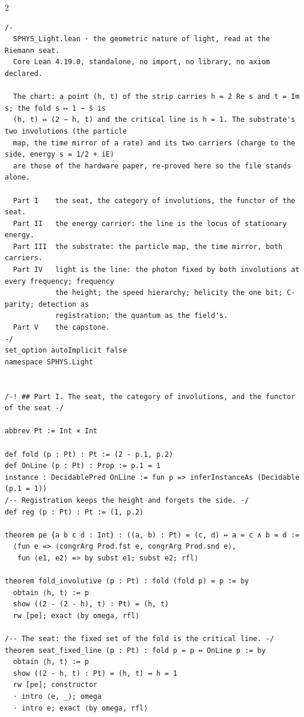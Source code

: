 \documentclass[10pt]{article}
\begin{document}
\begin{multicols}{2}
\begin{Verbatim}[fontsize=\fontsize{6.0}{6.9}\selectfont,breaklines,breakanywhere,breaksymbolleft={}]
/-
  SPHYS_Light.lean · the geometric nature of light, read at the Riemann seat.
  Core Lean 4.19.0, standalone, no import, no library, no axiom declared.

  The chart: a point (h, t) of the strip carries h = 2 Re s and t = Im s; the fold s ↦ 1 − s̄ is
  (h, t) ↦ (2 − h, t) and the critical line is h = 1. The substrate's two involutions (the particle
  map, the time mirror of a rate) and its two carriers (charge to the side, energy s = 1/2 + iE)
  are those of the hardware paper, re-proved here so the file stands alone.

  Part I    the seat, the category of involutions, the functor of the seat.
  Part II   the energy carrier: the line is the locus of stationary energy.
  Part III  the substrate: the particle map, the time mirror, both carriers.
  Part IV   light is the line: the photon fixed by both involutions at every frequency; frequency
            the height; the speed hierarchy; helicity the one bit; C-parity; detection as
            registration; the quantum as the field's.
  Part V    the capstone.
-/
set_option autoImplicit false
namespace SPHYS.Light


/-! ## Part I. The seat, the category of involutions, and the functor of the seat -/

abbrev Pt := Int × Int

def fold (p : Pt) : Pt := (2 - p.1, p.2)
def OnLine (p : Pt) : Prop := p.1 = 1
instance : DecidablePred OnLine := fun p => inferInstanceAs (Decidable (p.1 = 1))
/-- Registration keeps the height and forgets the side. -/
def reg (p : Pt) : Pt := (1, p.2)

theorem pe {a b c d : Int} : ((a, b) : Pt) = (c, d) ↔ a = c ∧ b = d :=
  ⟨fun e => ⟨congrArg Prod.fst e, congrArg Prod.snd e⟩,
   fun ⟨e1, e2⟩ => by subst e1; subst e2; rfl⟩

theorem fold_involutive (p : Pt) : fold (fold p) = p := by
  obtain ⟨h, t⟩ := p
  show ((2 - (2 - h), t) : Pt) = (h, t)
  rw [pe]; exact ⟨by omega, rfl⟩

/-- The seat: the fixed set of the fold is the critical line. -/
theorem seat_fixed_line (p : Pt) : fold p = p ↔ OnLine p := by
  obtain ⟨h, t⟩ := p
  show ((2 - h, t) : Pt) = (h, t) ↔ h = 1
  rw [pe]; constructor
  · intro ⟨e, _⟩; omega
  · intro e; exact ⟨by omega, rfl⟩


\end{Verbatim}
\end{multicols}
\end{document}
